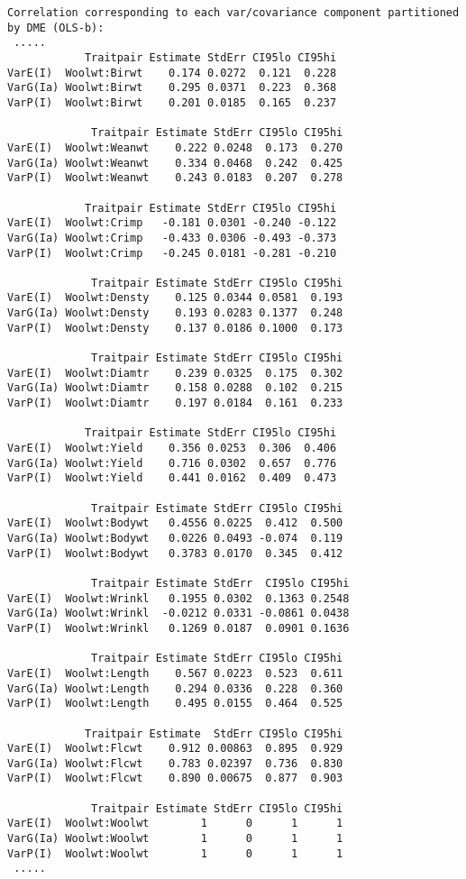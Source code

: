 \documentclass[titlepage]{article}  %
\begin{document}
\begin{verbatim}
Correlation corresponding to each var/covariance component partitioned by DME (OLS-b):
 .....
            Traitpair Estimate StdErr CI95lo CI95hi
VarE(I)  Woolwt:Birwt    0.174 0.0272  0.121  0.228
VarG(Ia) Woolwt:Birwt    0.295 0.0371  0.223  0.368
VarP(I)  Woolwt:Birwt    0.201 0.0185  0.165  0.237

             Traitpair Estimate StdErr CI95lo CI95hi
VarE(I)  Woolwt:Weanwt    0.222 0.0248  0.173  0.270
VarG(Ia) Woolwt:Weanwt    0.334 0.0468  0.242  0.425
VarP(I)  Woolwt:Weanwt    0.243 0.0183  0.207  0.278

            Traitpair Estimate StdErr CI95lo CI95hi
VarE(I)  Woolwt:Crimp   -0.181 0.0301 -0.240 -0.122
VarG(Ia) Woolwt:Crimp   -0.433 0.0306 -0.493 -0.373
VarP(I)  Woolwt:Crimp   -0.245 0.0181 -0.281 -0.210

             Traitpair Estimate StdErr CI95lo CI95hi
VarE(I)  Woolwt:Densty    0.125 0.0344 0.0581  0.193
VarG(Ia) Woolwt:Densty    0.193 0.0283 0.1377  0.248
VarP(I)  Woolwt:Densty    0.137 0.0186 0.1000  0.173

             Traitpair Estimate StdErr CI95lo CI95hi
VarE(I)  Woolwt:Diamtr    0.239 0.0325  0.175  0.302
VarG(Ia) Woolwt:Diamtr    0.158 0.0288  0.102  0.215
VarP(I)  Woolwt:Diamtr    0.197 0.0184  0.161  0.233

            Traitpair Estimate StdErr CI95lo CI95hi
VarE(I)  Woolwt:Yield    0.356 0.0253  0.306  0.406
VarG(Ia) Woolwt:Yield    0.716 0.0302  0.657  0.776
VarP(I)  Woolwt:Yield    0.441 0.0162  0.409  0.473

             Traitpair Estimate StdErr CI95lo CI95hi
VarE(I)  Woolwt:Bodywt   0.4556 0.0225  0.412  0.500
VarG(Ia) Woolwt:Bodywt   0.0226 0.0493 -0.074  0.119
VarP(I)  Woolwt:Bodywt   0.3783 0.0170  0.345  0.412

             Traitpair Estimate StdErr  CI95lo CI95hi
VarE(I)  Woolwt:Wrinkl   0.1955 0.0302  0.1363 0.2548
VarG(Ia) Woolwt:Wrinkl  -0.0212 0.0331 -0.0861 0.0438
VarP(I)  Woolwt:Wrinkl   0.1269 0.0187  0.0901 0.1636

             Traitpair Estimate StdErr CI95lo CI95hi
VarE(I)  Woolwt:Length    0.567 0.0223  0.523  0.611
VarG(Ia) Woolwt:Length    0.294 0.0336  0.228  0.360
VarP(I)  Woolwt:Length    0.495 0.0155  0.464  0.525

            Traitpair Estimate  StdErr CI95lo CI95hi
VarE(I)  Woolwt:Flcwt    0.912 0.00863  0.895  0.929
VarG(Ia) Woolwt:Flcwt    0.783 0.02397  0.736  0.830
VarP(I)  Woolwt:Flcwt    0.890 0.00675  0.877  0.903

             Traitpair Estimate StdErr CI95lo CI95hi
VarE(I)  Woolwt:Woolwt        1      0      1      1
VarG(Ia) Woolwt:Woolwt        1      0      1      1
VarP(I)  Woolwt:Woolwt        1      0      1      1
 .....
\end{verbatim}
 
\end{document}
